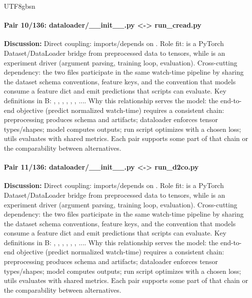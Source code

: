 \documentclass[11pt]{article}
\begin{document}
\begin{CJK*}{UTF8}{gbsn}
\paragraph{Pair 10/136: dataloader/\_\_init\_\_.py <-> run\_cread.py}
\textbf{Discussion:} Direct coupling: \texttt{} imports/depends on \texttt{}. Role fit: \texttt{} is a PyTorch Dataset/DataLoader bridge from preprocessed data to tensors, while \texttt{} is an experiment driver (argument parsing, training loop, evaluation). Cross-cutting dependency: the two files participate in the same watch-time pipeline by sharing the dataset schema conventions, feature keys, and the convention that models consume a feature dict and emit predictions that scripts can evaluate. Key definitions in B: \texttt{}, \texttt{}, \texttt{}, \texttt{}, \texttt{}, \texttt{}, .... Why this relationship serves the model: the end-to-end objective (predict normalized watch-time) requires a consistent chain: preprocessing produces schema and artifacts; dataloader enforces tensor types/shapes; model computes outputs; run script optimizes with a chosen loss; utils evaluates with shared metrics. Each pair supports some part of that chain or the comparability between alternatives.

\paragraph{Pair 11/136: dataloader/\_\_init\_\_.py <-> run\_d2co.py}
\textbf{Discussion:} Direct coupling: \texttt{} imports/depends on \texttt{}. Role fit: \texttt{} is a PyTorch Dataset/DataLoader bridge from preprocessed data to tensors, while \texttt{} is an experiment driver (argument parsing, training loop, evaluation). Cross-cutting dependency: the two files participate in the same watch-time pipeline by sharing the dataset schema conventions, feature keys, and the convention that models consume a feature dict and emit predictions that scripts can evaluate. Key definitions in B: \texttt{}, \texttt{}, \texttt{}, \texttt{}, \texttt{}, \texttt{}, .... Why this relationship serves the model: the end-to-end objective (predict normalized watch-time) requires a consistent chain: preprocessing produces schema and artifacts; dataloader enforces tensor types/shapes; model computes outputs; run script optimizes with a chosen loss; utils evaluates with shared metrics. Each pair supports some part of that chain or the comparability between alternatives.


\end{CJK*}
\end{document}
